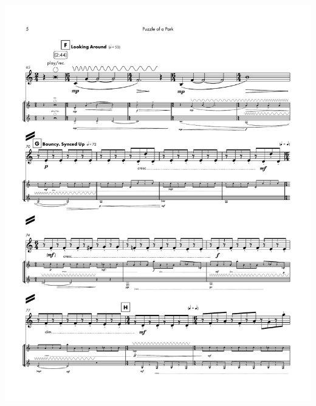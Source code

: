     \begin{center}
    \includegraphics[scale=0.75]{Scores/puzzlePart10.pdf}
    \end{center}
    \newpage
